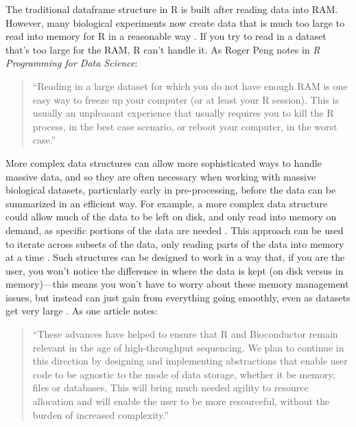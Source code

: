 \documentclass[]{tufte-book}
\begin{document}
The traditional dataframe structure in R is built after
reading data into RAM. However, many biological experiments now create
data that is much too large to read into memory for R in a reasonable way
\citep{lawrence2014scalable, hicks2021mbkmeans}. If you try to read in a dataset
that's too large for the RAM, R can't handle it. As Roger Peng notes in
\emph{R Programming for Data Science}:

\begin{quote}
``Reading in a large dataset for which you do not have enough RAM is one easy
way to freeze up your computer (or at least your R session). This is usually an
unpleasant experience that usually requires you to kill the R process, in the
best case scenario, or reboot your computer, in the worst case.'' \citep{peng2016r}
\end{quote}

More complex data structures can allow more sophisticated ways to handle massive
data, and so they are often necessary when working with massive biological
datasets, particularly early in pre-processing, before the data can be
summarized in an efficient way. For example, a more complex data structure could
allow much of the data to be left on disk, and only read into memory on demand,
as specific portions of the data are needed \citep{gatto2013msnbase, hicks2021mbkmeans}. This approach can be used to iterate across subsets of the
data, only reading parts of the data into memory at a time
\citep{lawrence2014scalable}. Such structures can be designed to work in a way that,
if you are the user, you won't notice the difference in where the data is kept
(on disk versus in memory)---this means you won't have to worry about these
memory management issues, but instead can just gain from everything going
smoothly, even as datasets get very large \citep{gatto2013msnbase}.
As one article notes:

\begin{quote}
``These advances have helped to ensure that R and Bioconductor remain relevant
in the age of high-throughput sequencing. We plan to continue in this direction
by designing and implementing abstractions that enable user code to be agnostic
to the mode of data storage, whether it be memory, files or databases. This will
bring much needed agility to resource allocation and will enable the user to be
more resourceful, without the burden of increased complexity.''
\citep{lawrence2014scalable}
\end{quote}
\end{document}
